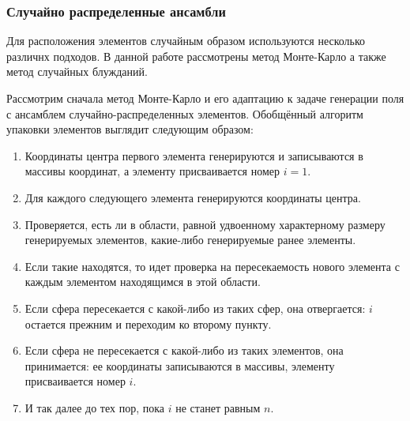 \subsubsection{Случайно распределенные ансамбли}
Для расположения элементов случайным образом используются несколько различнх подходов. В данной работе рассмотрены метод Монте-Карло а также метод случайных блужданий.

Рассмотрим сначала метод Монте-Карло и его адаптацию к задаче генерации поля с ансамблем случайно-распределенных элементов.
Обобщённый алгоритм упаковки элементов выглядит следующим образом:
\begin{enumerate}
    \item Координаты центра первого элемента генерируются и записываются в массивы координат, а элементу присваивается номер $i=1$.
    \item Для каждого следующего элемента  генерируются координаты центра.
    \item Проверяется, есть ли в области, равной удвоенному характерному размеру генерируемых элементов, какие-либо генерируемые ранее элементы.
    \item Если такие находятся, то идет проверка на пересекаемость нового элемента с каждым элементом находящимся в этой области.
    \item Если сфера пересекается с какой-либо из таких сфер, она отвергается: $i$ остается прежним и переходим ко второму пункту.
    \item Если сфера не пересекается с какой-либо из таких элементов, она принимается: ее координаты записываются в массивы, элементу присваивается номер $i$.
    \item И так далее до тех пор, пока $i$ не станет равным $n$. 
\end{enumerate}

